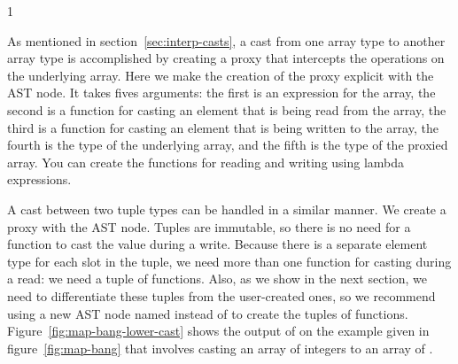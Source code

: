 \documentclass[7x10]{TimesAPriori_MIT}%
\def\pythonEd{1}
\providecommand{\BookEdition}{1}
\let\edition\BookEdition
\newcommand{\pythonColor}[0]{}
\numberwithin{theorem}{chapter}
\numberwithin{definition}{chapter}
\numberwithin{equation}{chapter}
\begin{document}
{\if\edition\pythonEd\pythonColor

As mentioned in section~\ref{sec:interp-casts}, a cast from one array
type to another array type is accomplished by creating a proxy that
intercepts the operations on the underlying array. Here we make the
creation of the proxy explicit with the  AST node. It
takes fives arguments: the first is an expression for the array, the
second is a function for casting an element that is being read from
the array, the third is a function for casting an element that is
being written to the array, the fourth is the type of the underlying
array, and the fifth is the type of the proxied array.  You can create
the functions for reading and writing using lambda expressions.

A cast between two tuple types can be handled in a similar manner.  We
create a proxy with the  AST node.  Tuples are
immutable, so there is no need for a function to cast the value during
a write.  Because there is a separate element type for each slot in
the tuple, we need more than one function for casting during a read:
we need a tuple of functions.
%
Also, as we show in the next section, we need to differentiate these
tuples from the user-created ones, so we recommend using a new AST
node named  instead of  to create the
tuples of functions.
%
Figure~\ref{fig:map-bang-lower-cast} shows the output of
 on the example given in figure~\ref{fig:map-bang}
that involves casting an array of integers to an array of \CANYTY{}.

\fi}
\end{document}
